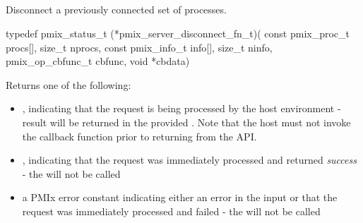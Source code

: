 \subsection{}

\summary

Disconnect a previously connected set of processes.

\format

\cspecificstart
\begin{codepar}
typedef pmix_status_t (*pmix_server_disconnect_fn_t)(
                             const pmix_proc_t procs[],
                             size_t nprocs,
                             const pmix_info_t info[],
                             size_t ninfo,
                             pmix_op_cbfunc_t cbfunc,
                             void *cbdata)
\end{codepar}
\cspecificend

\begin{arglist}
\end{arglist}

Returns one of the following:

\begin{itemize}
    \item {}, indicating that the request is being processed by the host environment - result will be returned in the provided . Note that the host must not invoke the callback function prior to returning from the \ac{API}.
    \item {}, indicating that the request was immediately processed and returned \textit{success} - the  will not be called
    \item a PMIx error constant indicating either an error in the input or that the request was immediately processed and failed - the  will not be called
\end{itemize}


